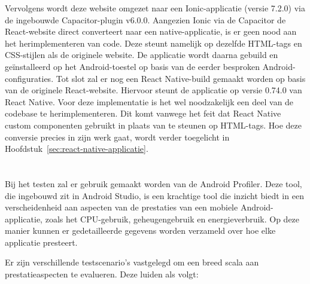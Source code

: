 Vervolgens wordt deze website omgezet naar een Ionic-applicatie (versie 7.2.0) via de ingebouwde Capacitor-plugin v6.0.0. Aangezien Ionic via de Capacitor de React-website direct converteert naar een native-applicatie, is er geen nood aan het herimplementeren van code. Deze steunt namelijk op dezelfde HTML-tags en CSS-stijlen als de originele website. De applicatie wordt daarna gebuild en geïnstalleerd op het Android-toestel op basis van de eerder besproken Android-configuraties. Tot slot zal er nog een React Native-build gemaakt worden op basis van de originele React-website. Hiervoor steunt de applicatie op versie 0.74.0 van React Native. Voor deze implementatie is het wel noodzakelijk een deel van de codebase te herimplementeren. Dit komt vanwege het feit dat React Native custom componenten gebruikt in plaats van te steunen op HTML-tags. Hoe deze conversie precies in zijn werk gaat, wordt verder toegelicht in Hoofdstuk~\ref{sec:react-native-applicatie}.

\section{}%
\label{sec:testen-en-resultaten}

Bij het testen zal er gebruik gemaakt worden van de Android Profiler. Deze tool, die ingebouwd zit in Android Studio, is een krachtige tool die inzicht biedt in een verscheidenheid aan aspecten van de prestaties van een mobiele Android-applicatie, zoals het CPU-gebruik, geheugengebruik en energieverbruik. Op deze manier kunnen er gedetailleerde gegevens worden verzameld over hoe elke applicatie presteert.

Er zijn verschillende testscenario's vastgelegd om een breed scala aan prestatieaspecten te evalueren. Deze luiden als volgt:

